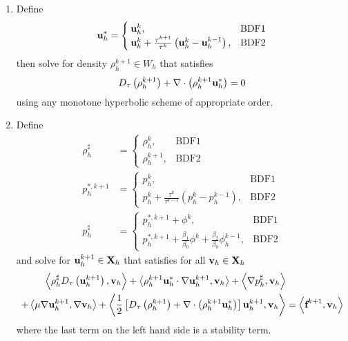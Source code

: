 \documentclass[letterpaper]{erdc}
\begin{document}
\begin{enumerate}
\item Define
\begin{equation}
  \textbf{u}_h^{*} = \begin{cases}
                \textbf{u}_h^{k}, & \mbox{BDF1} \\
                \textbf{u}_h^{k} + \frac{\tau^{k+1}}{\tau^k}\left( \textbf{u}_h^{k} - \textbf{u}_h^{k-1}\right), & \mbox{BDF2} 
               \end{cases}
 \end{equation}
then solve for density $\rho_h^{k+1}\in W_h$ that satisfies
\begin{equation}\label{eqn:generaldensity}
D_{\tau}\left(\rho_h^{k+1}\right) + \nabla\cdot\left( \rho_h^{k+1}\textbf{u}_h^{*} \right) = 0
\end{equation}
using any monotone hyperbolic scheme of appropriate order. 

\item Define
\begin{align}
  \rho_h^{\sharp} &= \begin{cases}
                       \rho_h^{k}, & \mbox{BDF1} \\
                       \rho_h^{k+1}, & \mbox{BDF2} 
                      \end{cases}\\
  p_h^{*,k+1} &= \begin{cases}
                p_h^{k}, & \mbox{BDF1}\\
                p_h^{k} + \frac{\tau^{k}}{\tau^{k-1}}\left( p_h^k - p_h^{k-1} \right), & \mbox{BDF2}
                \end{cases}\\
  p_h^{\sharp} &= \begin{cases}
                  p_h^{*,k+1} + \phi^{k}, & \mbox{BDF1}\\ 
                  p_h^{*,k+1} + \frac{\beta_1}{\beta_0}\phi^{k} + \frac{\beta_2}{\beta_0}\phi_h^{k-1}, & \mbox{BDF2} 
                 \end{cases}
\end{align}
and solve for $\textbf{u}_h^{k+1}\in\textbf{X}_h$ that satisfies for all $\textbf{v}_h\in\textbf{X}_h$
\begin{equation}\label{eqn:generalvelocity}
  \begin{split}
    \left\langle \rho_h^{\sharp}D_{\tau}\left(\textbf{u}_h^{k+1}\right), \textbf{v}_h \right\rangle  + \left\langle \rho_h^{k+1}\textbf{u}_h^{*}\cdot\nabla\textbf{u}_h^{k+1}, \textbf{v}_h \right\rangle +\left\langle \nabla p_h^{\sharp}, \textbf{v}_h \right\rangle &\\
     + \left\langle \mu\nabla\textbf{u}_h^{k+1}, \nabla\textbf{v}_h \right\rangle  + \left\langle \frac{1}{2}\left[ D_{\tau}\left(\rho_h^{k+1}\right) + \nabla\cdot\left( \rho_h^{k+1}\textbf{u}_h^{*} \right)\right] \textbf{u}_h^{k+1}, \textbf{v}_h \right\rangle &= \left\langle \textbf{f}^{k+1}, \textbf{v}_h \right\rangle
  \end{split}
\end{equation}
where the last term on the left hand side is a stability term.  


\end{enumerate}
\end{document}
